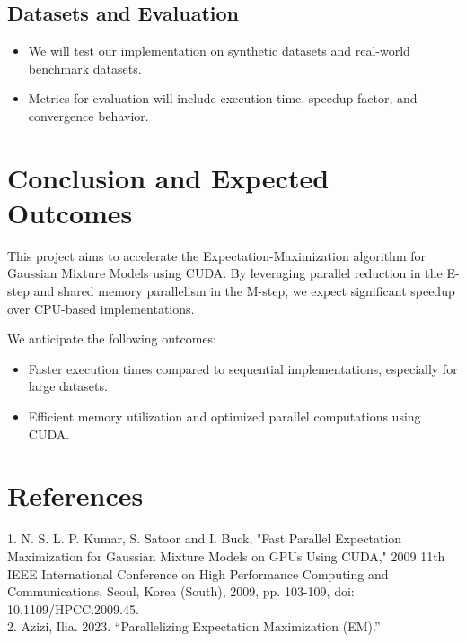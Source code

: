 \documentclass{article}
\begin{document}
\subsection{Datasets and Evaluation}
\begin{itemize}
    \item We will test our implementation on synthetic datasets and real-world benchmark datasets.
    \item Metrics for evaluation will include execution time, speedup factor, and convergence behavior.
\end{itemize}

\section{Conclusion and Expected Outcomes}
This project aims to accelerate the Expectation-Maximization algorithm for Gaussian Mixture Models using CUDA. By leveraging parallel reduction in the E-step and shared memory parallelism in the M-step, we expect significant speedup over CPU-based implementations. 

We anticipate the following outcomes:
\begin{itemize}
    \item Faster execution times compared to sequential implementations, especially for large datasets.
    \item Efficient memory utilization and optimized parallel computations using CUDA.
\end{itemize}

\section{References}

1. N. S. L. P. Kumar, S. Satoor and I. Buck, "Fast Parallel Expectation Maximization for Gaussian Mixture Models on GPUs Using CUDA," 2009 11th IEEE International Conference on High Performance Computing and Communications, Seoul, Korea (South), 2009, pp. 103-109, doi: 10.1109/HPCC.2009.45. \\
2. Azizi, Ilia. 2023. “Parallelizing Expectation Maximization (EM).” 
\end{document}
